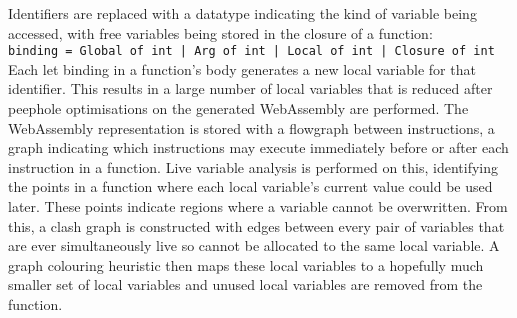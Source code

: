 Identifiers are replaced with a datatype indicating the kind of variable being accessed, with free variables being stored in the closure of a function:\\
\verb"binding = Global of int | Arg of int | Local of int | Closure of int"\\
Each let binding in a function's body generates a new local variable for that identifier. This results in a large number of local variables that is reduced after peephole optimisations on the generated WebAssembly are performed. The WebAssembly representation is stored with a flowgraph between instructions, a graph indicating which instructions may execute immediately before or after each instruction in a function. Live variable analysis is performed on this, identifying the points in a function where each local variable's current value could be used later. These points indicate regions where a variable cannot be overwritten. From this, a clash graph is constructed with edges between every pair of variables that are ever simultaneously live so cannot be allocated to the same local variable. A graph colouring heuristic then maps these local variables to a hopefully much smaller set of local variables and unused local variables are removed from the function.

